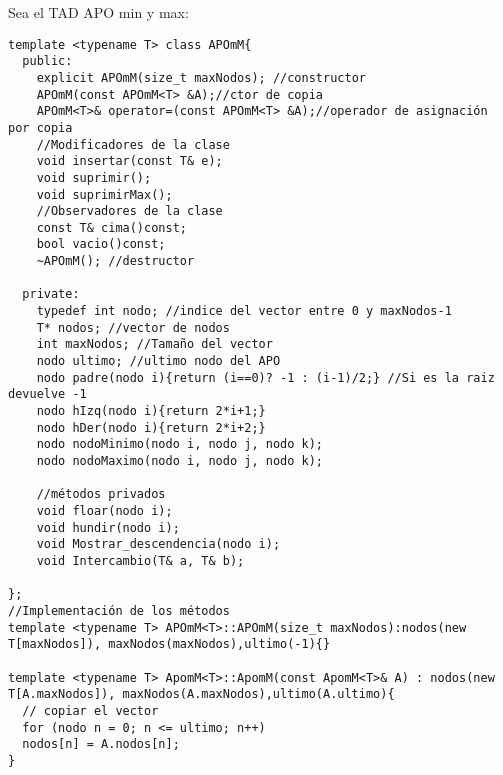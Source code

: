 Sea el TAD APO min y max:
\begin{verbatim}
template <typename T> class APOmM{
  public:
    explicit APOmM(size_t maxNodos); //constructor
    APOmM(const APOmM<T> &A);//ctor de copia
    APOmM<T>& operator=(const APOmM<T> &A);//operador de asignación por copia
    //Modificadores de la clase
    void insertar(const T& e);
    void suprimir();
    void suprimirMax();
    //Observadores de la clase
    const T& cima()const;
    bool vacio()const;
    ~APOmM(); //destructor

  private:
    typedef int nodo; //indice del vector entre 0 y maxNodos-1
    T* nodos; //vector de nodos
    int maxNodos; //Tamaño del vector
    nodo ultimo; //ultimo nodo del APO
    nodo padre(nodo i){return (i==0)? -1 : (i-1)/2;} //Si es la raiz devuelve -1
    nodo hIzq(nodo i){return 2*i+1;}
    nodo hDer(nodo i){return 2*i+2;}
    nodo nodoMinimo(nodo i, nodo j, nodo k);
    nodo nodoMaximo(nodo i, nodo j, nodo k);

    //métodos privados
    void floar(nodo i);
    void hundir(nodo i);
    void Mostrar_descendencia(nodo i);
    void Intercambio(T& a, T& b);

};
//Implementación de los métodos
template <typename T> APOmM<T>::APOmM(size_t maxNodos):nodos(new T[maxNodos]), maxNodos(maxNodos),ultimo(-1){}

template <typename T> ApomM<T>::ApomM(const ApomM<T>& A) : nodos(new T[A.maxNodos]), maxNodos(A.maxNodos),ultimo(A.ultimo){
  // copiar el vector
  for (nodo n = 0; n <= ultimo; n++)
  nodos[n] = A.nodos[n];
}


\end{verbatim}
